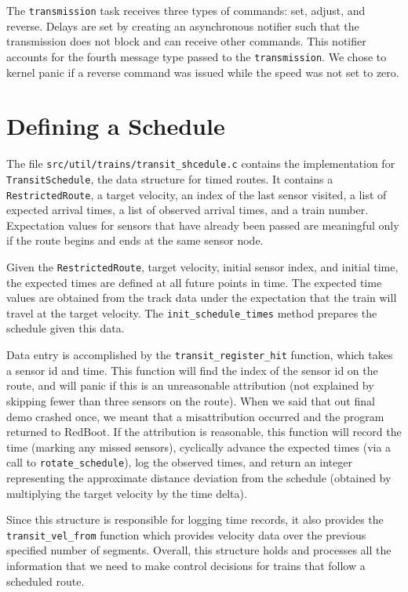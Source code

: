 \documentclass{amsart} \usepackage{amsmath} \usepackage{upgreek}
\newcommand{\x}[1]{\texttt{#1}}
\begin{document}
The \x{transmission} task receives three types of commands: set, adjust, and
reverse. Delays are set by creating an asynchronous notifier such that the
transmission does not block and can receive other commands. This notifier
accounts for the fourth message type passed to the \x{transmission}. We chose to
kernel panic if a reverse command was issued while the speed was not set to
zero.

\section*{Defining a Schedule}

The file \x{src/util/trains/transit\_shcedule.c} contains the implementation for
\x{TransitSchedule}, the data structure for timed routes. It contains a
\x{RestrictedRoute}, a target velocity, an index of the last sensor visited, a
list of expected arrival times, a list of observed arrival times, and a train
number. Expectation values for sensors that have already been passed are
meaningful only if the route begins and ends at the same sensor node.

Given the \x{RestrictedRoute}, target velocity, initial sensor index, and
initial time, the expected times are defined at all future points in time. The
expected time values are obtained from the track data under the expectation that
the train will travel at the target velocity. The \x{init\_schedule\_times}
method prepares the schedule given this data.

Data entry is accomplished by the \x{transit\_register\_hit} function, which
takes a sensor id and time. This function will find the index of the sensor id
on the route, and will panic if this is an unreasonable attribution (not
explained by skipping fewer than three sensors on the route). When we said that
out final demo crashed once, we meant that a misattribution occurred and the
program returned to RedBoot. If the attribution is reasonable, this function
will record the time (marking any missed sensors), cyclically advance the
expected times (via a call to \x{rotate\_schedule}), log the observed times, and
return an integer representing the approximate distance deviation from the
schedule (obtained by multiplying the target velocity by the time delta).

Since this structure is responsible for logging time records, it also provides
the \x{transit\_vel\_from} function which provides velocity data over the
previous specified number of segments. Overall, this structure holds and
processes all the information that we need to make control decisions for trains
that follow a scheduled route.
\end{document}
